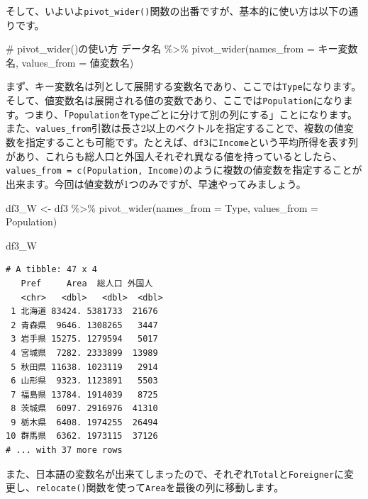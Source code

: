 \documentclass[
  a4paper,
  pandoc,
  ja=standard,
  jafont=haranoaji]{bxjsbook}
\newenvironment{Shaded}{\begin{snugshade}}{\end{snugshade}}
\newcommand{\AttributeTok}[1]{\textcolor[rgb]{0.00,0.48,0.65}{#1}}
\newcommand{\CommentTok}[1]{\textcolor[rgb]{0.37,0.37,0.37}{#1}}
\newcommand{\FunctionTok}[1]{\textcolor[rgb]{0.28,0.35,0.67}{#1}}
\newcommand{\NormalTok}[1]{\textcolor[rgb]{0.00,0.48,0.65}{#1}}
\newcommand{\OtherTok}[1]{\textcolor[rgb]{0.00,0.48,0.65}{#1}}
\newcommand{\SpecialCharTok}[1]{\textcolor[rgb]{0.37,0.37,0.37}{#1}}
\begin{document}
そして、いよいよ\texttt{pivot\_wider()}関数の出番ですが、基本的に使い方は以下の通りです。

\begin{Shaded}
\begin{Highlighting}[numbers=left,,]
\CommentTok{\# pivot\_wider()の使い方}
\NormalTok{データ名 }\SpecialCharTok{\%\textgreater{}\%}
  \FunctionTok{pivot\_wider}\NormalTok{(}\AttributeTok{names\_from  =}\NormalTok{ キー変数名,}
              \AttributeTok{values\_from =}\NormalTok{ 値変数名)}
\end{Highlighting}
\end{Shaded}

まず、キー変数名は列として展開する変数名であり、ここでは\texttt{Type}になります。そして、値変数名は展開される値の変数であり、ここでは\texttt{Population}になります。つまり、「\texttt{Population}を\texttt{Type}ごとに分けて別の列にする」ことになります。また、\texttt{values\_from}引数は長さ2以上のベクトルを指定することで、複数の値変数を指定することも可能です。たとえば、\texttt{df3}に\texttt{Income}という平均所得を表す列があり、これらも総人口と外国人それぞれ異なる値を持っているとしたら、\texttt{values\_from\ =\ c(Population,\ Income)}のように複数の値変数を指定することが出来ます。今回は値変数が1つのみですが、早速やってみましょう。

\begin{Shaded}
\begin{Highlighting}[numbers=left,,]
\NormalTok{df3\_W }\OtherTok{\textless{}{-}}\NormalTok{ df3 }\SpecialCharTok{\%\textgreater{}\%}
  \FunctionTok{pivot\_wider}\NormalTok{(}\AttributeTok{names\_from  =}\NormalTok{ Type,}
              \AttributeTok{values\_from =}\NormalTok{ Population)}

\NormalTok{df3\_W}
\end{Highlighting}
\end{Shaded}

\begin{verbatim}
# A tibble: 47 x 4
   Pref     Area  総人口 外国人
   <chr>   <dbl>   <dbl>  <dbl>
 1 北海道 83424. 5381733  21676
 2 青森県  9646. 1308265   3447
 3 岩手県 15275. 1279594   5017
 4 宮城県  7282. 2333899  13989
 5 秋田県 11638. 1023119   2914
 6 山形県  9323. 1123891   5503
 7 福島県 13784. 1914039   8725
 8 茨城県  6097. 2916976  41310
 9 栃木県  6408. 1974255  26494
10 群馬県  6362. 1973115  37126
# ... with 37 more rows
\end{verbatim}

また、日本語の変数名が出来てしまったので、それぞれ\texttt{Total}と\texttt{Foreigner}に変更し、\texttt{relocate()}関数を使って\texttt{Area}を最後の列に移動します。
\end{document}
